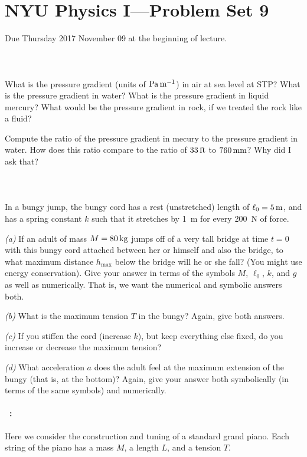 \documentclass[12pt]{article}
\begin{document}
\section*{NYU Physics I---Problem Set 9}

Due Thursday 2017 November 09 at the beginning of lecture.

\paragraph{\problemname~\theproblem}%
What is the pressure gradient (units of $\mathrm{Pa}\,\mathrm{m}^{-1}$) in air at sea level at STP?
What is the pressure gradient in water?
What is the pressure gradient in liquid mercury?
What would be the pressure gradient in rock, if we treated the rock like a fluid?

Compute the ratio of the pressure gradient in mecury to the pressure gradient
in water. How does this ratio compare to the ratio of $33\,\mathrm{ft}$ to $760\,\mathrm{mm}$?
Why did I ask that?

\paragraph{\problemname~\theproblem}%
In a bungy jump, the bungy cord has a rest (unstretched) length of
$\ell_0 = 5\,\mathrm{m}$, and has a spring constant $k$ such that it stretches
by 1~m for every 200~N of force.

\textsl{(a)} If an adult of mass $M=80\,\mathrm{kg}$ jumps off of a very tall
bridge at time $t=0$ with this bungy cord attached between her or
himself and also the bridge, to what maximum distance $h_\mathrm{max}$
below the bridge will he or she fall?  (You might use energy
conservation). Give your answer in terms of the symbols $M$, $\ell_0$,
$k$, and $g$ as well as numerically. That is, we want the numerical
and symbolic answers both.

\textsl{(b)} What is the maximum tension $T$ in the bungy? Again, give
both answers.

\textsl{(c)} If you stiffen the cord (increase $k$), but keep
everything else fixed, do you increase or decrease the maximum
tension?

\textsl{(d)} What acceleration $a$ does the adult feel at the maximum
extension of the bungy (that is, at the bottom)? Again, give your
answer both symbolically (in terms of the same symbols) and numerically.

\paragraph{\problemname~\theproblem:}%
Here we consider the construction and tuning of a standard grand piano.
Each string of the piano has a mass $M$, a length $L$, and a tension $T$.
\end{document}
